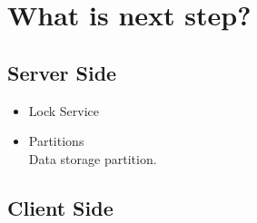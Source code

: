 \documentclass[paper=a4, fontsize=11pt]{scrartcl}
\numberwithin{equation}{section}		%
\numberwithin{figure}{section}			%
\numberwithin{table}{section}				%
\begin{document}
\section{What is next step?}
\subsection{Server Side}
\begin{itemize}
\item Lock Service\\
    
\item Partitions\\
    Data storage partition.
\end{itemize}

\subsection{Client Side}
\end{document}
